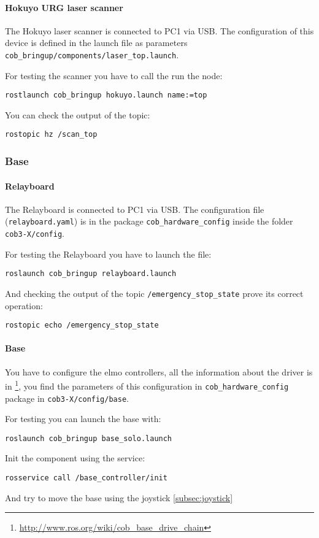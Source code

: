 \paragraph{Hokuyo URG laser scanner}
The Hokuyo laser scanner is connected to PC1 via USB. The configuration of this device is defined in the launch file as parameters \texttt{cob\_bringup/components/laser\_top.launch}.

For testing the scanner you have to call the run the node:
\begin{lstlisting}
rostlaunch cob_bringup hokuyo.launch name:=top
\end{lstlisting}

You can check the output of the topic:
\begin{lstlisting}
rostopic hz /scan_top
\end{lstlisting}

\subsubsection{Base}

\paragraph{Relayboard}
The Relayboard is connected to PC1 via USB. The configuration file (\texttt{relayboard.yaml}) is in the package \texttt{cob\_hardware\_config} inside the folder \texttt{cob3-X/config}.

For testing the Relayboard you have to launch the file:
\begin{lstlisting}
roslaunch cob_bringup relayboard.launch
\end{lstlisting}

And checking the output of the topic \texttt{/emergency\_stop\_state} prove its correct operation:
\begin{lstlisting}
rostopic echo /emergency_stop_state
\end{lstlisting}

\paragraph{Base}
You have to configure the elmo controllers, all the information about the driver is in \footnote{\url{http://www.ros.org/wiki/cob_base_drive_chain}}, you find the parameters of this configuration in \texttt{cob\_hardware\_config} package in \texttt{cob3-X/config/base}.

For testing you can launch the base with:
\begin{lstlisting}
roslaunch cob_bringup base_solo.launch
\end{lstlisting}
Init the component using the service:
\begin{lstlisting}
rosservice call /base_controller/init
\end{lstlisting}
And try to move the base using the joystick \ref{subsec:joystick}

